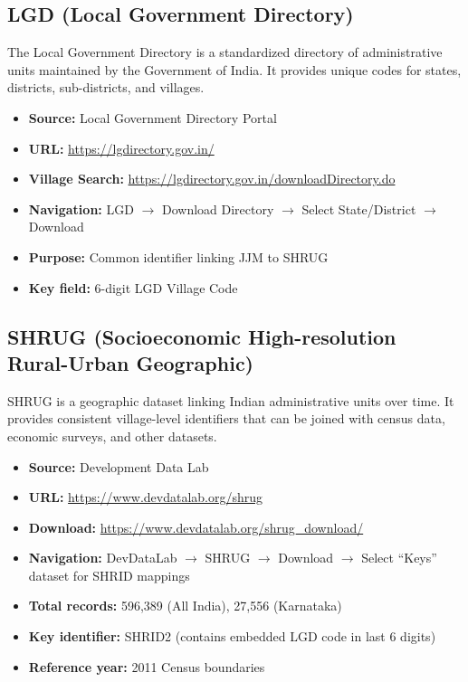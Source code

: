 \documentclass[11pt,a4paper]{article}
\begin{document}
\subsection{LGD (Local Government Directory)}
The Local Government Directory is a standardized directory of administrative units maintained by the Government of India. It provides unique codes for states, districts, sub-districts, and villages.

\begin{itemize}
    \item \textbf{Source:} Local Government Directory Portal
    \item \textbf{URL:} \url{https://lgdirectory.gov.in/}
    \item \textbf{Village Search:} \url{https://lgdirectory.gov.in/downloadDirectory.do}
    \item \textbf{Navigation:} LGD $\rightarrow$ Download Directory $\rightarrow$ Select State/District $\rightarrow$ Download
    \item \textbf{Purpose:} Common identifier linking JJM to SHRUG
    \item \textbf{Key field:} 6-digit LGD Village Code
\end{itemize}

\subsection{SHRUG (Socioeconomic High-resolution Rural-Urban Geographic)}
SHRUG is a geographic dataset linking Indian administrative units over time. It provides consistent village-level identifiers that can be joined with census data, economic surveys, and other datasets.

\begin{itemize}
    \item \textbf{Source:} Development Data Lab
    \item \textbf{URL:} \url{https://www.devdatalab.org/shrug}
    \item \textbf{Download:} \url{https://www.devdatalab.org/shrug_download/}
    \item \textbf{Navigation:} DevDataLab $\rightarrow$ SHRUG $\rightarrow$ Download $\rightarrow$ Select ``Keys'' dataset for SHRID mappings
    \item \textbf{Total records:} 596,389 (All India), 27,556 (Karnataka)
    \item \textbf{Key identifier:} SHRID2 (contains embedded LGD code in last 6 digits)
    \item \textbf{Reference year:} 2011 Census boundaries
\end{itemize}
\end{document}
